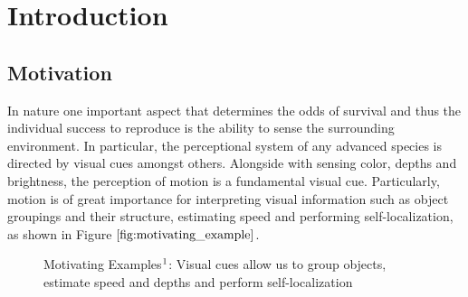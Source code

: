 \chapter{Introduction}
\section{Motivation}
In nature one important aspect that determines the odds of survival and thus the individual success to reproduce is the ability to sense the surrounding environment. In particular, the perceptional system of any advanced species is directed by visual cues amongst others. Alongside with sensing color, depths and brightness, the perception of motion is a fundamental visual cue. Particularly, motion is of great importance for interpreting visual information such as object groupings and their structure, estimating speed and performing self-localization, as shown in Figure $\ref{fig:motivating_example}$.
\begin{figure}[H]
\begin{center}
\end{center}
\caption[Motivating Example]{Motivating Examples$\footnotemark$: Visual cues allow us to group objects, estimate speed and depths and perform self-localization}
\label{fig:motivating_example}
\end{figure}
